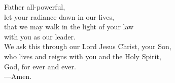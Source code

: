 \prayer


\begin{prayerverse}
Father all-powerful,\\
let your radiance dawn in our lives,\\
that we may walk in the light of your law\\
with you as our leader.\\
We ask this through our Lord Jesus Christ, your Son,\\
who lives and reigns with you and the Holy Spirit,\\
God, for ever and ever.\\
{\color{red}---\thinspace}Amen.
\end{prayerverse}

